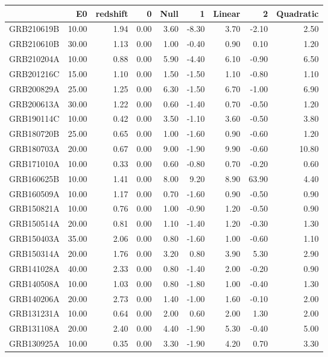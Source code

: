\begin{tabular}{lrrrrrrrr}
\toprule
 & E0 & redshift & 0 & Null & 1 & Linear & 2 & Quadratic \\
\midrule
GRB210619B & 10.00 & 1.94 & 0.00 & 3.60 & -8.30 & 3.70 & -2.10 & 2.50 \\
GRB210610B & 30.00 & 1.13 & 0.00 & 1.00 & -0.40 & 0.90 & 0.10 & 1.20 \\
GRB210204A & 10.00 & 0.88 & 0.00 & 5.90 & -4.40 & 6.10 & -0.90 & 6.50 \\
GRB201216C & 15.00 & 1.10 & 0.00 & 1.50 & -1.50 & 1.10 & -0.80 & 1.10 \\
GRB200829A & 25.00 & 1.25 & 0.00 & 6.30 & -1.50 & 6.70 & -1.00 & 6.90 \\
GRB200613A & 30.00 & 1.22 & 0.00 & 0.60 & -1.40 & 0.70 & -0.50 & 1.20 \\
GRB190114C & 10.00 & 0.42 & 0.00 & 3.50 & -1.10 & 3.60 & -0.50 & 3.80 \\
GRB180720B & 25.00 & 0.65 & 0.00 & 1.00 & -1.60 & 0.90 & -0.60 & 1.20 \\
GRB180703A & 20.00 & 0.67 & 0.00 & 9.00 & -1.90 & 9.90 & -0.60 & 10.80 \\
GRB171010A & 10.00 & 0.33 & 0.00 & 0.60 & -0.80 & 0.70 & -0.20 & 0.60 \\
GRB160625B & 10.00 & 1.41 & 0.00 & 8.00 & 9.20 & 8.90 & 63.90 & 4.40 \\
GRB160509A & 10.00 & 1.17 & 0.00 & 0.70 & -1.60 & 0.90 & -0.50 & 0.90 \\
GRB150821A & 10.00 & 0.76 & 0.00 & 1.00 & -0.90 & 1.20 & -0.50 & 0.90 \\
GRB150514A & 20.00 & 0.81 & 0.00 & 1.10 & -1.40 & 1.20 & -0.30 & 1.30 \\
GRB150403A & 35.00 & 2.06 & 0.00 & 0.80 & -1.60 & 1.00 & -0.60 & 1.10 \\
GRB150314A & 20.00 & 1.76 & 0.00 & 3.20 & 0.80 & 3.90 & 5.30 & 2.90 \\
GRB141028A & 40.00 & 2.33 & 0.00 & 0.80 & -1.40 & 2.00 & -0.20 & 0.90 \\
GRB140508A & 10.00 & 1.03 & 0.00 & 0.80 & -1.80 & 1.00 & -0.40 & 1.30 \\
GRB140206A & 20.00 & 2.73 & 0.00 & 1.40 & -1.00 & 1.60 & -0.10 & 2.00 \\
GRB131231A & 10.00 & 0.64 & 0.00 & 2.00 & 0.60 & 2.00 & 1.30 & 2.00 \\
GRB131108A & 20.00 & 2.40 & 0.00 & 4.40 & -1.90 & 5.30 & -0.40 & 5.00 \\
GRB130925A & 10.00 & 0.35 & 0.00 & 3.30 & -1.90 & 4.20 & 0.70 & 3.30 \\

\end{tabular}

